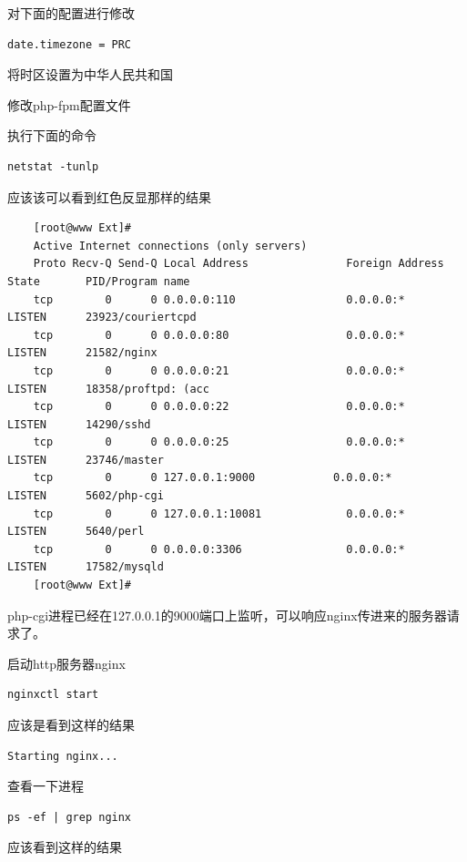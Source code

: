 \documentclass{article}
\begin{document}
对下面的配置进行修改

\begin{verbatim}
date.timezone = PRC
\end{verbatim}

将时区设置为中华人民共和国

修改php-fpm配置文件

执行下面的命令

\begin{verbatim}
netstat -tunlp
\end{verbatim}
应该该可以看到红色反显那样的结果

\begin{verbatim}
    [root@www Ext]# 
    Active Internet connections (only servers)
    Proto Recv-Q Send-Q Local Address               Foreign Address             State       PID/Program name
    tcp        0      0 0.0.0.0:110                 0.0.0.0:*                   LISTEN      23923/couriertcpd
    tcp        0      0 0.0.0.0:80                  0.0.0.0:*                   LISTEN      21582/nginx
    tcp        0      0 0.0.0.0:21                  0.0.0.0:*                   LISTEN      18358/proftpd: (acc
    tcp        0      0 0.0.0.0:22                  0.0.0.0:*                   LISTEN      14290/sshd
    tcp        0      0 0.0.0.0:25                  0.0.0.0:*                   LISTEN      23746/master
    tcp        0      0 127.0.0.1:9000            0.0.0.0:*                   LISTEN      5602/php-cgi
    tcp        0      0 127.0.0.1:10081             0.0.0.0:*                   LISTEN      5640/perl
    tcp        0      0 0.0.0.0:3306                0.0.0.0:*                   LISTEN      17582/mysqld
    [root@www Ext]#
\end{verbatim}
php-cgi进程已经在127.0.0.1的9000端口上监听，可以响应nginx传进来的服务器请求了。

启动http服务器nginx

\begin{verbatim}
nginxctl start
\end{verbatim}

应该是看到这样的结果

\begin{verbatim}
Starting nginx...
\end{verbatim}

查看一下进程

\begin{verbatim}
ps -ef | grep nginx
\end{verbatim}

应该看到这样的结果
\end{document}
